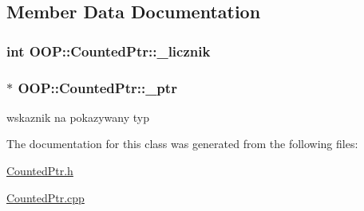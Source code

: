 \subsection{\-Member \-Data \-Documentation}
\hypertarget{classOOP_1_1CountedPtr_af164c5e11320b91ea4744fe23c6c3d5b}{
\subsubsection[{\-\_\-licznik}]{\setlength{\rightskip}{0pt plus 5cm}int {\bf \-O\-O\-P\-::\-Counted\-Ptr\-::\-\_\-licznik}}}\label{classOOP_1_1CountedPtr_af164c5e11320b91ea4744fe23c6c3d5b}
\hypertarget{classOOP_1_1CountedPtr_a2bd5db7ffc59b7811e484c3e858950bd}{
\subsubsection[{\-\_\-ptr}]{$\ast$ {\bf \-O\-O\-P\-::\-Counted\-Ptr\-::\-\_\-ptr}}}\label{classOOP_1_1CountedPtr_a2bd5db7ffc59b7811e484c3e858950bd}
wskaznik na pokazywany typ 

\-The documentation for this class was generated from the following files\-:\begin{DoxyCompactItemize}
\item 
\hyperlink{CountedPtr_8h}{\-Counted\-Ptr.\-h}\item 
\hyperlink{CountedPtr_8cpp}{\-Counted\-Ptr.\-cpp}\end{DoxyCompactItemize}
